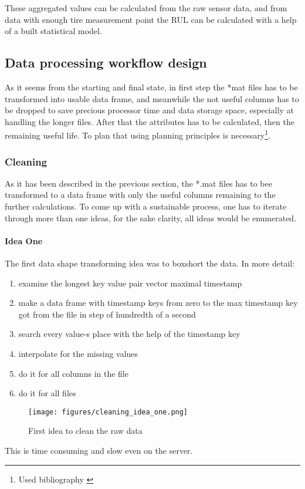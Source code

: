 These aggregated values can be calculated from the raw sensor data, and from data with enough tire measurement point the RUL can be calculated with a help of a built statistical model.

\subsection{Data processing workflow design}
As it seems from the starting and final state, in first step the *mat files has to be transformed into usable data frame, and meanwhile the not useful columns has to be dropped to save precious processor time and data storage space, especially at handling the longer files. After that the attributes has to be calculated, then the remaining useful life.
To plan that using planning principles is necessary\footnote{Used bibliography \cite{CSDISTILLED}\cite{DATACAMP}\cite{LeanThinking}}.
	\subsubsection{Cleaning}
		\noindent
	As it has been described in the previous section, the *.mat files has to bee transformed to a data frame with only the useful columns remaining to the further calculations.
		\noindent
	To come up with a sustainable process, one has to iterate through more than one ideas, for the sake clarity, all ideas would be enumerated.
		\paragraph{Idea One}
			The first data shape transforming idea was to boxshort the data. In more detail:
\begin{enumerate}
	\item{examine the longest key value pair vector maximal timestamp} 
	\item{make a data frame with timestamp keys from zero to the max timestamp key got from the file in step of hundredth of a second}
	\item{search every value-s place with the help of the timestamp key}
	\item{interpolate for the missing values}
	\item{do it for all columns in the file}
	\item{do it for all files}
\end{enumerate}
			\begin{figure}[!ht]
			\centering
			\texttt{[image: figures/cleaning\_idea\_one.png]}
			\caption{First idea to clean the raw data} 
			\end{figure}
		\noindent
This is time consuming and slow even on the server.
